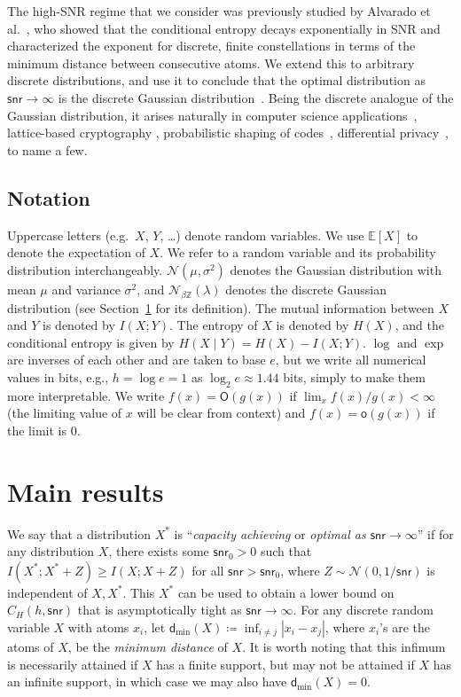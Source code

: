 \documentclass[11pt]{article}
\newcommand{\calN}{\mathcal{N}}
\newcommand{\calNdisc}[1]{\mathcal{N}_{#1 \bbZ}}
\renewcommand{\o}{\mathsf{o}}
\renewcommand{\O}{\mathsf{O}}
\newcommand{\snr}{\mathsf{snr}}
\newcommand{\bbE}{\mathbb{E}}
\newcommand{\bbZ}{\mathbb{Z}}
\newcommand{\dmin}{\mathsf{d}_{\min}}
\begin{document}
	The high-SNR regime that we consider was previously studied by Alvarado et al.~\cite{highSNR_alvarado}, who showed that the conditional entropy decays exponentially in SNR and characterized the exponent for discrete, finite constellations in terms of the minimum distance between consecutive atoms.  We extend this to arbitrary discrete distributions, and use it to conclude that the optimal distribution as $\snr \to \infty$ is the discrete Gaussian distribution~\cite{canonne2020discrete,stephens2017gaussian}.
	Being the discrete analogue of the Gaussian distribution, it arises naturally in computer science applications~\cite{sampling}, lattice-based cryptography \cite{Dwarakanath2014,prest:tel-01245066}, probabilistic shaping of codes~\cite{shaping_discrete}, differential privacy~\cite{canonne2020discrete}, to name a few. 
	
	
	
	
	
	
	\subsection{Notation}
	Uppercase letters (e.g.\ $X$, $Y$, \dots) denote random variables. We use $\bbE[X]$ to denote the expectation of $X$.
	We refer to a random variable and its probability distribution interchangeably.
	$\calN(\mu, \sigma^2)$ denotes the Gaussian distribution with mean $\mu$ and variance $\sigma^2$, and $\calNdisc{\beta}(\lambda)$ denotes the discrete Gaussian distribution (see Section~\ref{sec: main} for its definition).
	The mutual information between $X$ and $Y$ is denoted by $I(X;Y)$. The entropy of $X$ is denoted by $H(X)$, and the conditional entropy is given by $H(X \mid Y) = H(X) - I(X;Y)$. 
	$\log$ and $\exp$ are inverses of each other and are taken to base $e$, but we write all numerical values in bits, e.g., $h = \log e = 1$ as $\log_2 e \approx 1.44$ bits, simply to make them more interpretable.
	We write $f(x) = \O(g(x))$ if $\lim_x f(x)/g(x) < \infty$ (the limiting value of $x$ will be clear from context) and $f(x) = \o(g(x))$ if the limit is $0$.
	
	
	\section{Main results} \label{sec: main}
	
	We say that a distribution $X^*$ is ``\emph{capacity achieving} or \emph{optimal as $\snr \to \infty$}'' if for any distribution $X$, there exists some $\snr_0 > 0$ such that $I(X^*; X^* + Z) \geq I(X; X + Z)$ for all $\snr > \snr_0$, where $Z \sim \calN(0,1/\snr)$ is independent of $X, X^*$.  This $X^*$ can be used to obtain a lower bound on $C_H(h, \snr)$ that is asymptotically tight as $\snr \to \infty$. 
	For any discrete random variable $X$ with atoms $x_i$, let $\dmin(X) \coloneqq  \inf_{i\neq j} |x_{i} - x_j|$, where $x_i$'s are the atoms of $X$, be the \emph{minimum distance} of $X$.  It is worth noting that this infimum is necessarily attained if $X$ has a finite support, but may not be attained if $X$ has an infinite support, in which case we may also have $\dmin(X) = 0$.
	
\end{document}
